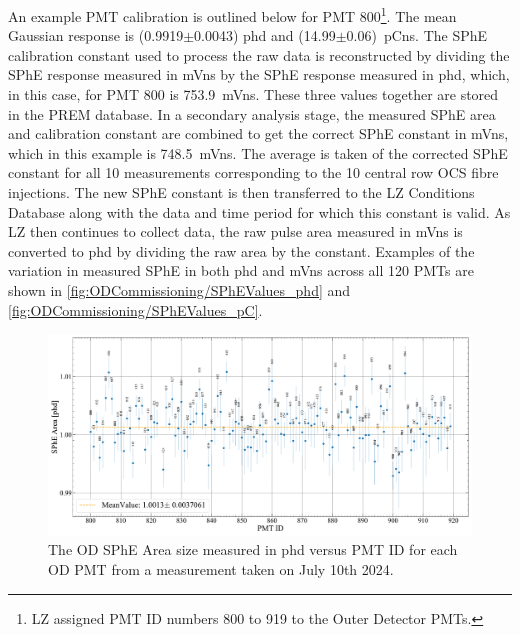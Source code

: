 An example PMT calibration is outlined below for PMT 800\footnote{LZ assigned PMT ID numbers 800 to 919 to the Outer Detector PMTs.}. The mean Gaussian response is (0.9919$\pm$0.0043) phd and (14.99$\pm$0.06)~pCns. The SPhE calibration constant used to process the raw data is reconstructed by dividing the SPhE response measured in mVns by the SPhE response measured in phd, which, in this case, for PMT 800 is 753.9~mVns. These three values together are stored in the PREM database. In a secondary analysis stage, the measured SPhE area and calibration constant are combined to get the correct SPhE constant in mVns, which in this example is 748.5~mVns. The average is taken of the corrected SPhE constant for all 10 measurements corresponding to the 10 central row OCS fibre injections. The new SPhE constant is then transferred to the LZ Conditions Database along with the data and time period for which this constant is valid. As LZ then continues to collect data, the raw pulse area measured in mVns is converted to phd by dividing the raw area by the constant. Examples of the variation in measured SPhE in both phd and mVns across all 120 PMTs are shown in \autoref{fig:ODCommissioning/SPhEValues_phd} and \autoref{fig:ODCommissioning/SPhEValues_pC}.
\begin{figure}[ht!]
    \centering
    \includegraphics[width=\textwidth]{figures/ODCommissioning/SPHE_phd_2024-7-10.pdf}
    \caption[The OD SPhE Area size measured in phd versus PMT ID for each OD PMT.]{The OD SPhE Area size measured in phd versus PMT ID for each OD PMT from a measurement taken on July 10th 2024.}
    \label{fig:ODCommissioning/SPhEValues_phd}
\end{figure}
